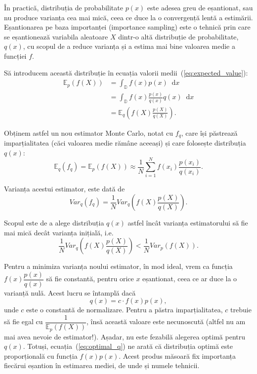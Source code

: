 \documentclass[12pt,a4paper]{report}
\newcommand*\diff{\mathop{}\!\mathrm{d}}
\numberwithin{equation}{section} %
\begin{document}
În practică, distribuția de probabilitate $p(x)$ este adesea greu de eșantionat,
sau nu produce varianța cea mai mică, ceea ce duce la o convergență lentă a
estimării.
Eșantionarea pe baza importanței (importance sampling) este o tehnică prin care
se eșantionează variabila aleatoare $X$ dintr-o altă distribuție de probabilitate,
$q(x)$, cu scopul de a reduce varianța și a estima mai bine valoarea medie a funcției
$f$.

Să introducem această distribuție în ecuația valorii medii~(\ref{eq:expected_value}):
\begin{equation}
	\begin{aligned}
		\mathbb{E}_p(f(X)) & = \int_{\mathbb{D}} f(x) p(x)\diff x                   \\
		                   & = \int_{\mathbb{D}} f(x) \frac{p(x)}{q(x)} q(x)\diff x \\
		                   & = \mathbb{E}_q\left(f(X) \frac{p(X)}{q(X)}\right).
	\end{aligned}
\end{equation}

Obținem astfel un nou estimator Monte Carlo, notat cu $f_q$, care își păstrează imparțialitatea
(căci valoarea medie rămâne aceeași) și care folosește distribuția $q(x)$:
\begin{equation}
	\mathbb{E}_q(f_q) = \mathbb{E}_p(f(X)) \approx \frac{1}{N} \sum_{i=1}^{N} f(x_i) \frac{p(x_i)}{q(x_i)}.
\end{equation}

Varianța acestui estimator, este dată de
\begin{equation}
	Var_q(f_q) = \frac{1}{N}Var_q\left(f(X) \frac{p(X)}{q(X)}\right).
\end{equation}

Scopul este de a alege distribuția $q(x)$ astfel încât varianța estimatorului să fie
mai mică decât varianța inițială, i.e.
\begin{equation}
	\frac{1}{N}Var_q\left(f(X) \frac{p(X)}{q(X)}\right) < \frac{1}{N}Var_p(f(X)).
\end{equation}

Pentru a minimiza varianța noului estimator, în mod ideal, vrem ca funcția
$f(x) \dfrac{p(x)}{q(x)}$ să fie constantă, pentru orice $x$ eșantionat, ceea
ce ar duce la o varianță nulă. Acest lucru se întamplă dacă
\begin{equation}\label{eq:optimal_q}
	q(x) = c \cdot f(x)p(x),
\end{equation}
unde $c$ este o constantă de normalizare. Pentru a păstra imparțialitatea, $c$ trebuie
să fie egal cu $\dfrac{1}{\mathbb{E}_p(f(X))}$, însă această valoare este necunoscută
(altfel nu am mai avea nevoie de estimator!). Așadar, nu este fezabilă alegerea
optimă pentru $q(x)$. Totuși, ecuația~(\ref{eq:optimal_q}) ne arată că distribuția
optimă este proporțională cu funcția $f(x)p(x)$. Acest produs măsoară fix
importanța fiecărui eșantion în estimarea mediei, de unde și numele tehnicii.
\end{document}
